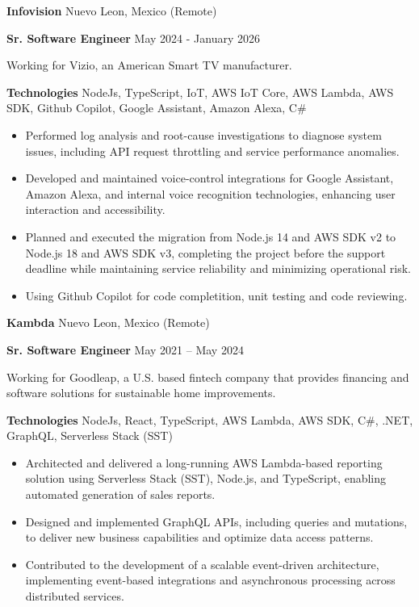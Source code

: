 \documentclass[11pt]{article}
\begin{document}
\vspace{5pt}
\textbf{Infovision} \hfill Nuevo Leon, Mexico (Remote)

\textbf{Sr. Software Engineer} \hfill May 2024 - January 2026

Working for Vizio, an American Smart TV manufacturer.

\textbf{Technologies} NodeJs, TypeScript, IoT, AWS IoT Core, AWS Lambda, AWS SDK, Github Copilot, Google Assistant, Amazon Alexa, C\#
\begin{itemize}[noitemsep, topsep=0pt, partopsep=0pt, parsep=0pt]

    \item Performed log analysis and root-cause investigations to diagnose system issues, including API request throttling and service performance anomalies.
    \item Developed and maintained voice-control integrations for Google Assistant, Amazon Alexa, and internal voice recognition technologies, enhancing user interaction and accessibility.
    \item Planned and executed the migration from Node.js 14 and AWS SDK v2 to Node.js 18 and AWS SDK v3, completing the project before the support deadline while maintaining service reliability and minimizing operational risk.
    \item Using Github Copilot for code completition, unit testing and code reviewing.
\end{itemize}

\vspace{5pt}
\textbf{Kambda} \hfill Nuevo Leon, Mexico (Remote)

\textbf{Sr. Software Engineer} \hfill May 2021 – May 2024

Working for Goodleap, a U.S. based fintech company that provides financing and software solutions for sustainable home improvements.

\textbf{Technologies} NodeJs, React, TypeScript, AWS Lambda, AWS SDK, C\#, .NET, GraphQL, Serverless Stack (SST)
\begin{itemize}[noitemsep, topsep=0pt, partopsep=0pt, parsep=0pt]

    \item Architected and delivered a long-running AWS Lambda-based reporting solution using Serverless Stack (SST), Node.js, and TypeScript, enabling automated generation of sales reports.
    \item Designed and implemented GraphQL APIs, including queries and mutations, to deliver new business capabilities and optimize data access patterns.
    \item Contributed to the development of a scalable event-driven architecture, implementing event-based integrations and asynchronous processing across distributed services.
\end{itemize}
\end{document}
